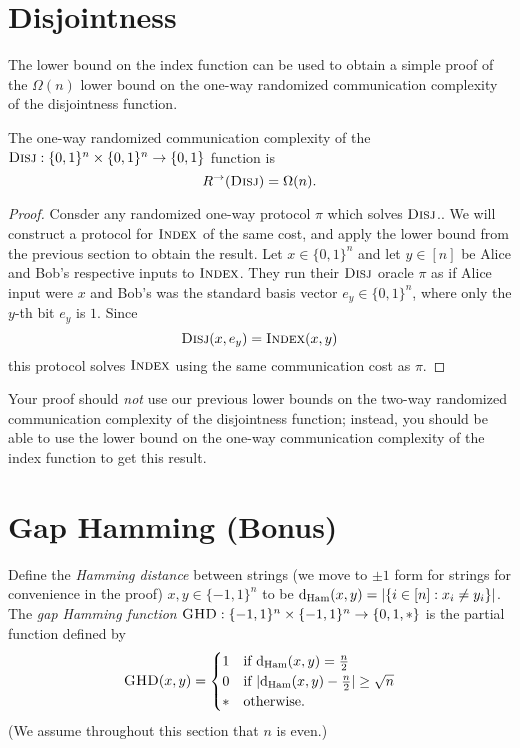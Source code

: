 \newpage 
\section{Disjointness}

The lower bound on the index function can be used to obtain a simple proof of the $\Omega(n)$ lower bound on the one-way randomized communication complexity of the disjointness function.

\begin{theorem}
The one-way randomized communication complexity of the $\textsc{Disj} : \{0,1\}^n \times \{0,1\}^n \to \{0,1\}$ function is
\[
R^\rightarrow(\textsc{Disj}) = \Omega(n).
\]
\end{theorem}

\begin{proof}
Consder any randomized one-way protocol $\pi$ which solves $\textsc{Disj}$.. We will construct a protocol for $\textsc{Index}$ of the same cost, and apply the lower bound from the previous section to obtain the result. Let $x \in \{0,1\}^n$ and let $y \in [n]$ be Alice and Bob's respective inputs to $\textsc{Index}$. They run their $\textsc{Disj}$ oracle $\pi$ as if Alice input were $x$ and Bob's was the standard basis vector $e_y\in\{0,1\}^n$, where only the $y$-th bit $e_y$ is $1$. Since
$$\textsc{Disj}(x,e_y) = \textsc{Index}(x,y)$$ 
this protocol solves $\textsc{Index}$ using the same communication cost as $\pi$.
\end{proof}

\begin{remark}
Your proof should \emph{not} use our previous lower bounds on the two-way randomized communication complexity of the disjointness function; instead, you should be able to use the lower bound on the one-way communication complexity of the index function to get this result.
\end{remark}



\newpage 
\section{Gap Hamming (Bonus)}

Define the \emph{Hamming distance} between strings (we move to $\pm 1$ form for strings for convenience in the proof) $x,y \in \{-1,1\}^n$ to be $\mathrm{d}_{\mathrm{Ham}}(x,y) = |\{i \in [n] : x_i \neq y_i\}|$.
The \emph{gap Hamming function} $\textsc{GHD} : \{-1,1\}^n \times \{-1,1\}^n \to \{0,1,*\}$ is the partial function defined by
\[
\textsc{GHD}(x,y) = \begin{cases}
1 & \mbox{if } \mathrm{d}_{\mathrm{Ham}}(x,y) = \frac n2 \\
0 & \mbox{if } |\mathrm{d}_{\mathrm{Ham}}(x,y) - \frac n2| \ge \sqrt{n} \\
* & \mbox{otherwise.}
\end{cases}
\] 
(We assume throughout this section that $n$ is even.)

